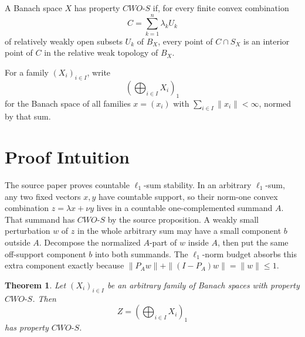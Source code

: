 \documentclass[11pt]{article}
\newtheorem{theorem}{Theorem}
\newcommand{\CWOS}{\textit{CWO-S}}
\begin{document}
A Banach space \(X\) has property \(\CWOS\) if, for every finite convex
combination
\[
  C=\sum_{k=1}^n \lambda_k U_k
\]
of relatively weakly open subsets \(U_k\) of \(B_X\), every point of
\(C\cap S_X\) is an interior point of \(C\) in the relative weak topology of
\(B_X\).

For a family \((X_i)_{i\in I}\), write
\[
  \left(\bigoplus_{i\in I} X_i\right)_1
\]
for the Banach space of all families \(x=(x_i)\) with
\(\sum_{i\in I}\|x_i\|<\infty\), normed by that sum.

\section*{Proof Intuition}

The source paper proves countable \(\ell_1\)-sum stability.  In an arbitrary
\(\ell_1\)-sum, any two fixed vectors \(x,y\) have countable support, so their
norm-one convex combination \(z=\lambda x+\nu y\) lives in a countable
one-complemented summand \(A\).  That summand has \(\CWOS\) by the source
proposition.  A weakly small perturbation \(w\) of \(z\) in the whole
arbitrary sum may have a small component \(b\) outside \(A\).  Decompose the
normalized \(A\)-part of \(w\) inside \(A\), then put the same off-support
component \(b\) into both summands.  The \(\ell_1\)-norm budget absorbs this
extra component exactly because \(\|P_Aw\|+\|(I-P_A)w\|=\|w\|\le1\).

\begin{theorem}\label{thm:arbitrary-l1}
Let \((X_i)_{i\in I}\) be an arbitrary family of Banach spaces with property
\(\CWOS\).  Then
\[
  Z=\left(\bigoplus_{i\in I} X_i\right)_1
\]
has property \(\CWOS\).
\end{theorem}
\end{document}
